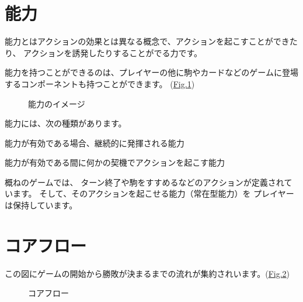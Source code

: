 \documentclass[letterpaper,10pt,dvipdfmx]{sphinxmanual}
\begin{document}
\section{能力}
\label{\detokenize{core/core:id12}}
\sphinxAtStartPar
能力とはアクションの効果とは異なる概念で、アクションを起こすことができたり、 アクションを誘発したりすることがでる力です。

\sphinxAtStartPar
能力を持つことができるのは、プレイヤーの他に駒やカードなどのゲームに登場するコンポーネントも持つことができます。
(\hyperref[\detokenize{core/core:ability-image}]{Fig.\@ \ref{\detokenize{core/core:ability-image}}})

\begin{figure}[htbp]
\centering
\capstart

\noindent{}
\caption{能力のイメージ}\label{\detokenize{core/core:id45}}\label{\detokenize{core/core:ability-image}}\end{figure}

\sphinxAtStartPar
能力には、次の種類があります。
\begin{description}
\sphinxAtStartPar
能力が有効である場合、継続的に発揮される能力

\sphinxAtStartPar
能力が有効である間に何かの契機でアクションを起こす能力

\end{description}

\sphinxAtStartPar
概ねのゲームでは、
ターン終了や駒をすすめるなどのアクションが定義されています。
そして、そのアクションを起こせる能力（常在型能力）を
プレイヤーは保持しています。


\section{コアフロー}
\label{\detokenize{core/core:coreflowsec}}\label{\detokenize{core/core:id13}}
\sphinxAtStartPar
この図にゲームの開始から勝敗が決まるまでの流れが集約されいます。(\hyperref[\detokenize{core/core:coreflow-2}]{Fig.\@ \ref{\detokenize{core/core:coreflow-2}}})

\begin{figure}[htbp]
\centering
\capstart

\noindent{}
\caption{コアフロー}\label{\detokenize{core/core:id46}}\label{\detokenize{core/core:coreflow-2}}\end{figure}
\end{document}
